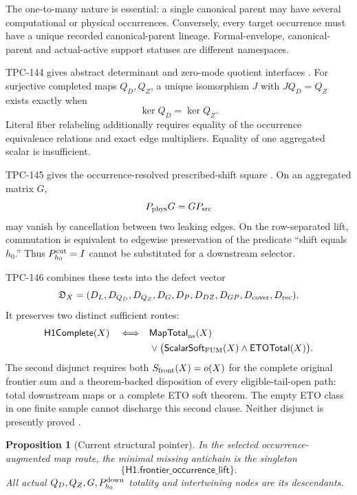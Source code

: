 \documentclass[11pt]{article}
\newtheorem{proposition}[theorem]{Proposition}
\theoremstyle{definition}
\theoremstyle{remark}
\begin{document}
The one-to-many nature is essential: a single canonical parent may
have several computational or physical occurrences.  Conversely,
every target occurrence must have a unique recorded canonical-parent
lineage.  Formal-envelope, canonical-parent and actual-active support
statuses are different namespaces.

TPC-144 gives abstract determinant and zero-mode quotient interfaces
\citep{WangTPC144}.  For surjective completed maps \(Q_D,Q_Z\), a
unique isomorphism \(J\) with \(JQ_D=Q_Z\) exists exactly when
\[
 \ker Q_D=\ker Q_Z.
\]
Literal fiber relabeling additionally requires equality of the
occurrence equivalence relations and exact edge multipliers.
Equality of one aggregated scalar is insufficient.

TPC-145 gives the occurrence-resolved prescribed-shift square
\citep{WangTPC145}.  On an aggregated matrix \(G\),
\[
 P_{\rm phys}G=GP_{\rm src}
\]
may vanish by cancellation between two leaking edges.  On the
row-separated lift, commutation is equivalent to edgewise preservation
of the predicate ``shift equals \(h_0\).''  Thus
\(P_{h_0}^{\rm cut}=I\) cannot be substituted for a downstream
selector.

TPC-146 combines these tests into the defect vector
\[
 \mathfrak D_X=
 (D_L,D_{Q_D},D_{Q_Z},D_G,D_P,D_{DZ},D_{GP},
   D_{\rm cover},D_{\rm rec}).
\]
It preserves two distinct sufficient routes:
\[
\begin{split}
 \mathsf{H1Complete}(X)
 \quad\Longleftrightarrow\quad&
 \mathsf{MapTotal}_{\rm ns}(X)\\
 &{}\lor\bigl(
 \mathsf{ScalarSoft}_{\rm FUM}(X)
 \land\mathsf{ETOTotal}(X)\bigr).
\end{split}
\]
The second disjunct requires both
\(S_{\rm front}(X)=o(X)\) for the complete original frontier sum and
a theorem-backed disposition of every eligible-tail-open path:
total downstream maps or a complete ETO soft theorem.  The empty ETO
class in one finite sample cannot discharge this second clause.
Neither disjunct is presently proved \citep{WangTPC146}.

\begin{proposition}[Current structural pointer]
\label{prop:pointer}
In the selected occurrence-augmented map route, the minimal missing
antichain is the singleton
\[
 \boxed{\{\mathsf{H1.frontier\_occurrence\_lift}\}}.
\]
All actual \(Q_D,Q_Z,G,P_{h_0}^{\rm down}\) totality and intertwining
nodes are its descendants.
\end{proposition}
\end{document}
